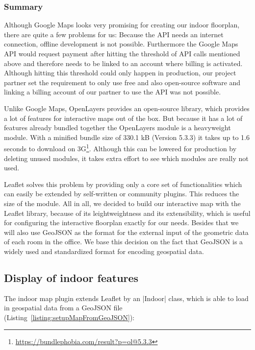 \subsubsection{Summary}

Although Google Maps looks very promising for creating our indoor floorplan, there are quite a few problems for us: Because the API needs an internet connection, offline development is not possible. 
Furthermore the Google Maps API would request payment after hitting the threshold of API calls mentioned above and therefore needs to be linked to an account where billing is activated. Although hitting this threshold could only happen in production, our project partner set the requirement to only use free and also open-source software and linking a billing account of our partner to use the API was not possible. 

Unlike Google Maps, OpenLayers provides an open-source library, which provides a lot of features for interactive maps out of the box.
But because it has a lot of features already bundled together the OpenLayers module is a heavyweight module. With a minified bundle size of 330.1 kB (Version 5.3.3) it takes up to 1.6 seconds to download on 3G\footnote{\url{https://bundlephobia.com/result?p=ol@5.3.3}}. Although this can be lowered for production by deleting unused modules, it takes extra effort to see which modules are really not used.

Leaflet solves this problem by providing only a core set of functionalities which can easily be extended by self-written or community plugins. This reduces the size of the module. All in all, we decided to build our interactive map with the Leaflet library, because of its leightweightness and its extensibility, which is useful for configuring the interactive floorplan exactly for our needs. Besides that we will also use GeoJSON as the format for the external input of the geometric data of each room in the office. We base this decision on the fact that GeoJSON is a widely used and standardized format for encoding geospatial data.

\subsection{Display of indoor features}
\label{Display of indoor features}

The indoor map plugin extends Leaflet by an |Indoor| class, which is able to load in geospatial data from a GeoJSON file (Listing~\ref{listing:setupMapFromGeoJSON}):

